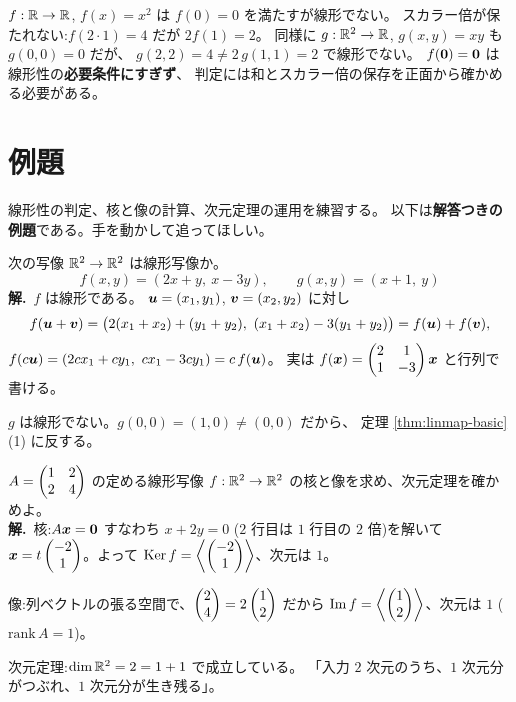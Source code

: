 \begin{hanrei}[$f(\vect{0}) = \vect{0}$ でも線形とは限らない]\label{hanrei:linmap-square}
$f : \mathbb{R} \to \mathbb{R}$, $f(x) = x^2$ は $f(0) = 0$ を満たすが線形でない。
スカラー倍が保たれない:$f(2 \cdot 1) = 4$ だが $2f(1) = 2$。
同様に $g : \mathbb{R}^2 \to \mathbb{R}$, $g(x, y) = xy$ も $g(0,0) = 0$ だが、
$g(2, 2) = 4 \neq 2\,g(1, 1) = 2$ で線形でない。
$f(\vect{0}) = \vect{0}$ は線形性の\textbf{必要条件にすぎず}、
判定には和とスカラー倍の保存を正面から確かめる必要がある。
\end{hanrei}

\section{例題}

線形性の判定、核と像の計算、次元定理の運用を練習する。
以下は\textbf{解答つきの例題}である。手を動かして追ってほしい。

\begin{rei}[例題・基本(線形性の判定)]\label{rei:linmap-check}
次の写像 $\mathbb{R}^2 \to \mathbb{R}^2$ は線形写像か。
\[
f(x, y) = (2x + y,\ x - 3y), \qquad g(x, y) = (x + 1,\ y)
\]
\textbf{解.}\ $f$ は線形である。
$\bm{u} = (x_1, y_1)$, $\bm{v} = (x_2, y_2)$ に対し
\[
f(\bm{u} + \bm{v})
= \bigl(2(x_1 + x_2) + (y_1 + y_2),\ (x_1 + x_2) - 3(y_1 + y_2)\bigr)
= f(\bm{u}) + f(\bm{v}),
\]
$f(c\bm{u}) = (2cx_1 + cy_1,\ cx_1 - 3cy_1) = c\,f(\bm{u})$。
実は $f(\bm{x}) = \begin{pmatrix}2 & 1 \\ 1 & -3\end{pmatrix}\bm{x}$ と行列で書ける。

$g$ は線形でない。$g(0, 0) = (1, 0) \neq (0, 0)$ だから、
定理 \ref{thm:linmap-basic}(1) に反する。
\end{rei}

\begin{rei}[例題・基本(核と像の計算)]\label{rei:linmap-kerim}
$A = \begin{pmatrix}1 & 2 \\ 2 & 4\end{pmatrix}$ の定める線形写像
$f : \mathbb{R}^2 \to \mathbb{R}^2$ の核と像を求め、次元定理を確かめよ。\\
\textbf{解.}\ 核:$A\bm{x} = \bm{0}$ すなわち $x + 2y = 0$
($2$ 行目は $1$ 行目の $2$ 倍)を解いて
$\bm{x} = t\begin{pmatrix}-2 \\ 1\end{pmatrix}$。よって
$\mathrm{Ker}\,f = \left\langle \begin{pmatrix}-2 \\ 1\end{pmatrix} \right\rangle$、次元は $1$。

像:列ベクトルの張る空間で、$\begin{pmatrix}2 \\ 4\end{pmatrix} = 2\begin{pmatrix}1 \\ 2\end{pmatrix}$ だから
$\mathrm{Im}\,f = \left\langle \begin{pmatrix}1 \\ 2\end{pmatrix} \right\rangle$、次元は $1$
($\mathrm{rank}\,A = 1$)。

次元定理:$\dim \mathbb{R}^2 = 2 = 1 + 1$ で成立している。
「入力 $2$ 次元のうち、$1$ 次元分がつぶれ、$1$ 次元分が生き残る」。
\end{rei}

